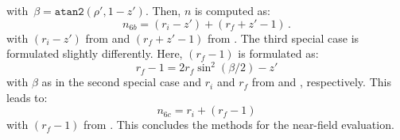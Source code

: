 with~$\beta = \texttt{atan2}(\rho', 1-z')$.
Then, $n$ is computed as:
\begin{equation}
  n_{6b} = (r_i - z') + (r_f + z'-1) \, .
\end{equation}
with $(r_i - z')$ from  and $(r_f + z' - 1)$ from .
The third special case is formulated slightly differently.
Here, $(r_f-1)$ is formulated as:
\begin{equation}
  r_f - 1 = 2 r_f \sin^2(\beta/2) - z' \label{eqn:rf_1}
\end{equation}
with $\beta$ as in the second special case
and $r_i$ and $r_f$ from  and , respectively.
This leads to:
\begin{equation}
  n_{6c} = r_i + (r_f - 1)
\end{equation}
with $(r_f - 1)$ from .
This concludes the methods for the near-field evaluation.

